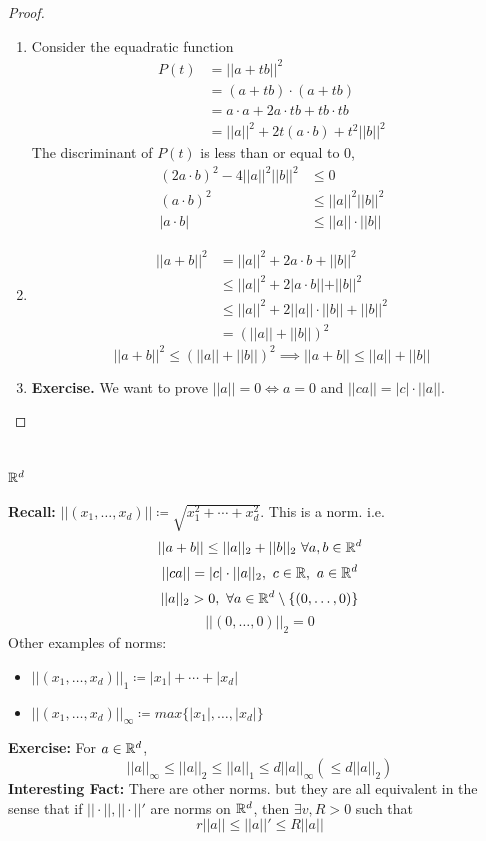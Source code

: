 \documentclass[openany]{report}
\begin{document}
\begin{proof}
    ~\newline
    \begin{enumerate}[label=(\roman*)]
        \item Consider the equadratic function
        \begin{align*}
            P(t) &= ||a+tb||^2\\
                &=(a+tb)\cdot(a+tb)\\
                &=a\cdot a + 2a\cdot tb + tb\cdot tb\\
                &=||a||^2 + 2t(a\cdot b) + t^2||b||^2
        \end{align*}
        The discriminant of $P(t)$ is less than or equal to 0,
        \begin{align*}
            (2a\cdot b)^2 - 4||a||^2||b||^2 &\leq 0\\
            (a\cdot b)^2 &\leq ||a||^2||b||^2\\
            |a\cdot b| &\leq ||a||\cdot||b||
        \end{align*}
        \item 
        \begin{align*}
            ||a+b||^2 &= ||a||^2 + 2a\cdot b + ||b||^2\\
                    &\leq ||a||^2 + 2|a\cdot b|| + ||b||^2\\
                    &\leq ||a||^2 + 2||a||\cdot||b|| + ||b||^2\\
                    &= (||a|| + ||b||)^2
        \end{align*}
        \[||a+b||^2 \leq (||a|| + ||b||)^2 \implies ||a+b|| \leq ||a||+||b||\]
        \item \textbf{Exercise.} We want to prove $||a|| = 0 \iff a = 0$ and $||ca|| = |c|\cdot||a||$.
    \end{enumerate}
\end{proof}
\chapter{$\mathbb{R}^d$}
\textbf{Recall:} $||(x_1, \dots, x_d)|| \coloneqq \sqrt{x_1^2 + \cdots + x_d^2}$. This is a norm. i.e. 
$$||a + b|| \leq ||a||_2 + ||b||_2 \ \forall a,b \in \mathbb{R}^d$$ 
$$||ca|| = |c|\cdot ||a||_2, \ c \in \mathbb{R}, \ a \in \mathbb{R}^d$$ 
$$||a||_2 > 0, \ \forall a \in \mathbb{R}^d \setminus \{(0,\dots,0)\}$$
$$||(0,\dots, 0)||_2 = 0$$
Other examples of norms: 
\begin{itemize}
    \item $||(x_1, \dots, x_d)||_1 \coloneqq |x_1| + \cdots + |x_d|$
    \item  $||(x_1, \dots, x_d)||_\infty \coloneqq max\{|x_1|, \dots, |x_d|\}$
\end{itemize}
\textbf{Exercise:} For $a \in \mathbb{R}^d$, $$||a||_\infty \leq ||a||_2 \leq ||a||_1 \leq d||a||_\infty (\leq d||a||_2)$$
\textbf{Interesting Fact:} There are other norms. but they are all equivalent in the sense that if $||\cdot||, ||\cdot||'$ are norms on $\mathbb{R}^d$, then $\exists v, R > 0$ such that
$$r||a|| \leq ||a||' \leq R||a||$$
\end{document}
